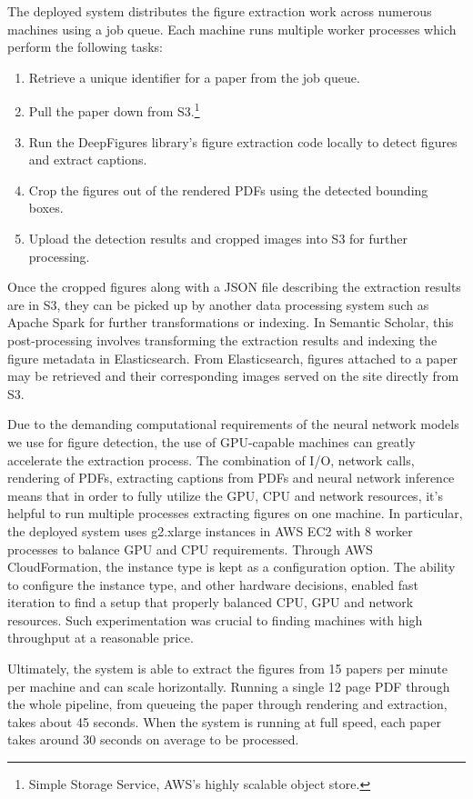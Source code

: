 \documentclass[sigconf]{acmart}
\begin{document}
The deployed system distributes the figure extraction work across numerous machines using a job queue. Each machine runs multiple worker processes which perform the following tasks:

\begin{enumerate}
  \item Retrieve a unique identifier for a paper from the job queue.
  \item Pull the paper down from S3.\footnote{Simple Storage Service, AWS's highly scalable object store.}
  \item Run the DeepFigures library's figure extraction code locally to detect figures and extract captions.
  \item Crop the figures out of the rendered PDFs using the detected bounding boxes.
  \item Upload the detection results and cropped images into S3 for further processing.
\end{enumerate}

Once the cropped figures along with a JSON file describing the extraction results are in S3, they can be picked up by another data processing system such as Apache Spark for further transformations or indexing. In Semantic Scholar, this post-processing involves transforming the extraction results and indexing the figure metadata in Elasticsearch. From Elasticsearch, figures attached to a paper may be retrieved and their corresponding images served on the site directly from S3.


Due to the demanding computational requirements of the neural network models we use for figure detection, the use of GPU-capable machines can greatly accelerate the extraction process. The combination of I/O, network calls, rendering of PDFs, extracting captions from PDFs and neural network inference means that in order to fully utilize the GPU, CPU and network resources, it's helpful to run multiple processes extracting figures on one machine. In particular, the deployed system uses g2.xlarge instances in AWS EC2 with 8 worker processes to balance GPU and CPU requirements. Through AWS CloudFormation, the instance type is kept as a configuration option. The ability to configure the instance type, and other hardware decisions, enabled fast iteration to find a setup that properly balanced CPU, GPU and network resources. Such experimentation was crucial to finding machines with high throughput at a reasonable price.

Ultimately, the system is able to extract the figures from 15 papers per minute per machine and can scale horizontally. Running a single 12 page PDF through the whole pipeline, from queueing the paper through rendering and extraction, takes about 45 seconds. When the system is running at full speed, each paper takes around 30 seconds on average to be processed.
\end{document}
